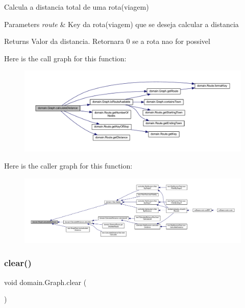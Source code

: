 Calcula a distancia total de uma rota(viagem)


\begin{DoxyParams}{Parameters}
{\em route} & Key da rota(viagem) que se deseja calcular a distancia \\
\hline
\end{DoxyParams}
\begin{DoxyReturn}{Returns}
Valor da distancia. Retornara 0 se a rota nao for possivel 
\end{DoxyReturn}
Here is the call graph for this function\+:\nopagebreak
\begin{figure}[H]
\begin{center}
\leavevmode
\includegraphics[width=350pt]{classdomain_1_1_graph_a7b7f2784b1c0ab3ab14ce6c271659913_cgraph}
\end{center}
\end{figure}
Here is the caller graph for this function\+:\nopagebreak
\begin{figure}[H]
\begin{center}
\leavevmode
\includegraphics[width=350pt]{classdomain_1_1_graph_a7b7f2784b1c0ab3ab14ce6c271659913_icgraph}
\end{center}
\end{figure}
\mbox{\label{classdomain_1_1_graph_ab310780b6719b7b94e8eea0a0603f6c1}} 
\subsubsection{\texorpdfstring{clear()}{clear()}}
{\footnotesize\ttfamily void domain.\+Graph.\+clear (\begin{DoxyParamCaption}{ }\end{DoxyParamCaption})}

